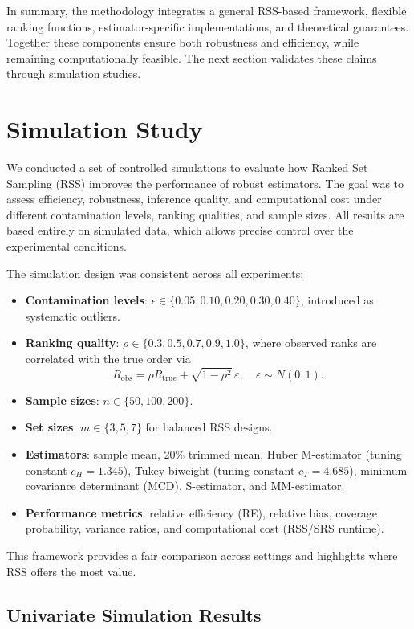 \documentclass[12pt]{article}
\begin{document}
In summary, the methodology integrates a general RSS-based framework, flexible ranking functions, estimator-specific implementations, and theoretical guarantees. Together these components ensure both robustness and efficiency, while remaining computationally feasible. The next section validates these claims through simulation studies.

\section{Simulation Study}
\label{sec:simulation}
We conducted a set of controlled simulations to evaluate how Ranked Set Sampling (RSS) improves the performance of robust estimators. The goal was to assess efficiency, robustness, inference quality, and computational cost under different contamination levels, ranking qualities, and sample sizes. All results are based entirely on simulated data, which allows precise control over the experimental conditions.

The simulation design was consistent across all experiments:
\begin{itemize}
    \item \textbf{Contamination levels}: $\epsilon \in \{0.05, 0.10, 0.20, 0.30, 0.40\}$, introduced as systematic outliers.
    \item \textbf{Ranking quality}: $\rho \in \{0.3, 0.5, 0.7, 0.9, 1.0\}$, where observed ranks are correlated with the true order via
    \[
    R_{\text{obs}} = \rho R_{\text{true}} + \sqrt{1-\rho^2}\,\varepsilon,
    \quad \varepsilon \sim N(0,1).
    \]
    \item \textbf{Sample sizes}: $n \in \{50, 100, 200\}$.
    \item \textbf{Set sizes}: $m \in \{3,5,7\}$ for balanced RSS designs.
    \item \textbf{Estimators}: sample mean, 20\% trimmed mean, Huber M-estimator (tuning constant $c_H = 1.345$), Tukey biweight (tuning constant $c_T = 4.685$), minimum covariance determinant (MCD), S-estimator, and MM-estimator.
    \item \textbf{Performance metrics}: relative efficiency (RE), relative bias, coverage probability, variance ratios, and computational cost (RSS/SRS runtime).
\end{itemize}

This framework provides a fair comparison across settings and highlights where RSS offers the most value.

\subsection{Univariate Simulation Results}
\label{subsec:univariate_simulation}
\end{document}
